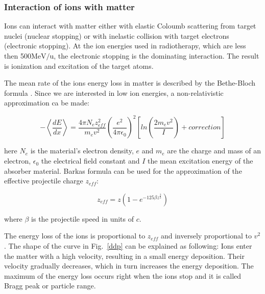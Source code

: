 \documentclass[type=dr, dr=rernat, accentcolor=tud7b,colorbacktitle, bigchapter, openright, twoside, 12pt ]{tudthesis}
\begin{document}
\subsubsection{Interaction of ions with matter}
\label{iion}
Ions can interact with matter either with elastic Coloumb scattering from target nuclei (nuclear stopping) or with inelastic collision with target electrons (electronic stopping).
At the ion energies used in radiotherapy, which are less then 500$\mathrm{MeV}/\mathrm{u}$, the electronic stopping is the dominating interaction. The result is ionization and excitation of the target atoms.

The mean rate of the ions energy loss in matter is described by the Bethe-Bloch formula \cite{Bethe1930, Bloch1933}. Since we are interested in low ion energies, a non-relativistic approximation ca be made:

\begin{equation}
- \left \langle \frac{dE}{dx} \right \rangle = \frac{ 4 \pi N_{e} z_{eff}^{2} }{ m_{e} v^{2} } \left( \frac{e^{2}}{4\pi \epsilon_{0}} \right) ^{2} \left[ln \left( \frac{2m_{e}v^{2}}{I} \right)+correction \right]
 \label{bethe}
\end{equation}

here $N_{e}$ is the material's electron density, $e$ and $m_{e}$ are the charge and mass 
of an electron, $\epsilon_{0}$ the electrical field constant and $I$ the mean excitation energy of the absorber material. 
Barkas formula \cite{Barkas1963} can be used for the approximation of the effective projectile charge $z_{eff}$: 

\begin{equation}
 z_{eff} = z \left( 1 - e^{-125 \beta z^{\frac{2}{3}}} \right)
\end{equation}

where $\beta$ is the projectile speed in units of $c$.

The energy loss of the ions is proportional to $z_{eff}$ and inversely proportional to $v^2$. The shape of the curve in Fig.~\ref{ddp} can be explained as following: Ions enter the matter with a high velocity, resulting in a small energy deposition. Their velocity gradually decreases, which in turn increases the energy deposition. The maximum of the energy loss occurs right when the ions stop and it is called Bragg peak or particle range.
\end{document}
